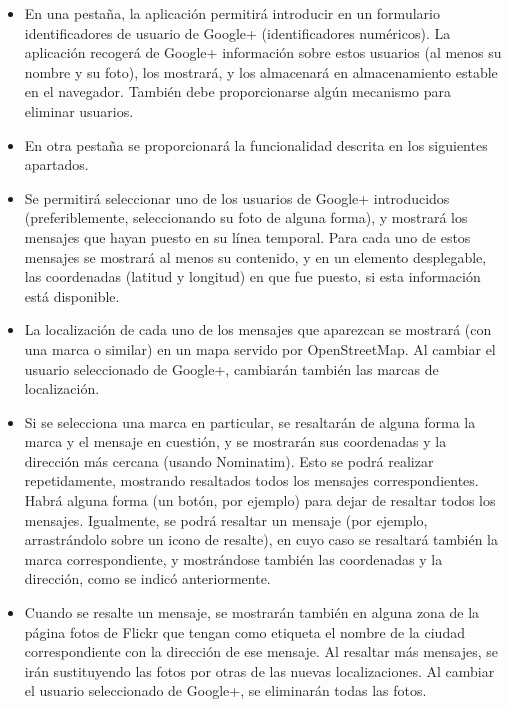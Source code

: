 \begin{itemize}
\item En una pestaña, la aplicación permitirá introducir en un formulario identificadores de usuario de Google+ (identificadores numéricos). La aplicación recogerá de Google+ información sobre estos usuarios (al menos su nombre y su foto), los mostrará, y los almacenará en almacenamiento estable en el navegador. También debe proporcionarse algún mecanismo para eliminar usuarios.

\item En otra pestaña se proporcionará la funcionalidad descrita en los siguientes apartados.

\item Se permitirá seleccionar uno de los usuarios de Google+ introducidos (preferiblemente, seleccionando su foto de alguna forma), y mostrará los mensajes que hayan puesto en su línea temporal. Para cada uno de estos mensajes se mostrará al menos su contenido, y en un elemento desplegable, las coordenadas (latitud y longitud) en que fue puesto, si esta información está disponible.
\item La localización de cada uno de los mensajes que aparezcan se mostrará (con una marca o similar) en un mapa servido por OpenStreetMap. Al cambiar el usuario seleccionado de Google+, cambiarán también las marcas de localización.

\item Si se selecciona una marca en particular, se resaltarán de alguna forma la marca y el mensaje en cuestión, y se mostrarán sus coordenadas y la dirección más cercana (usando Nominatim). Esto se podrá realizar repetidamente, mostrando resaltados todos los mensajes correspondientes. Habrá alguna forma (un botón, por ejemplo) para dejar de resaltar todos los mensajes. Igualmente, se podrá resaltar un mensaje (por ejemplo, arrastrándolo sobre un icono de resalte), en cuyo caso se resaltará también la marca correspondiente, y mostrándose también las coordenadas y la dirección, como se indicó anteriormente.

\item Cuando se resalte un mensaje, se mostrarán también en alguna zona de la página fotos de Flickr que tengan como etiqueta el nombre de la ciudad correspondiente con la dirección de ese mensaje. Al resaltar más mensajes, se irán sustituyendo las fotos por otras de las nuevas localizaciones. Al cambiar el usuario seleccionado de Google+, se eliminarán todas las fotos.
\end{itemize}

